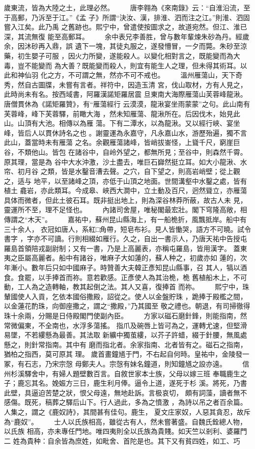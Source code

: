 \documentclass{ctexart}
\begin{document}
歲東流，皆為大陸之土，此理必然。 　　唐李翱為《來南錄》云：``自淮沿流，至于高郵，乃泝至于江。''《孟 子》所謂``決汝、漢，排淮、泗而注之江。''則淮、泗固嘗入江矣。此乃禹 之舊跡也。熙宁中，曾遣使按圖求之，故道宛然。但江、淮已深，其流無復 能至高郵耳。 　　余中表兄李善胜，曾与數年輩煉朱砂為丹。經歲余，因沐砂再入鼎，誤 遺下一塊，其徒丸服之，遂發懵冒，一夕而斃。朱砂至涼藥，初生嬰子可服 ，因火力所變，遂能殺人。以變化相對言之，既能變而為大毒，豈不能變而 為大善？既能變而殺人，則宜有能生人之理，但未得其術耳。以此和神仙羽 化之方，不可謂之無，然亦不可不戒也。 　　溫州雁蕩山，天下奇秀，然自古圖牒，未嘗有言者。祥符中，因造玉清 宮，伐山取材，方有人見之，此時尚未有名。按西域書，阿羅漢諾矩羅居震 旦東南大海際雁蕩山芙蓉峰龍湫。唐僧貫休為《諾矩羅贊》，有``雁蕩經行 云漠漠，龍湫宴坐雨蒙蒙''之句。此山南有芙蓉峰，峰下芙蓉驛，前瞰大海 ，然未知雁蕩、龍湫所在。后因伐木，始見此山。山頂有大池。相傳以為雁 蕩。下有二潭水，以為龍湫。又以經行峽、宴坐峰，皆后人以貫休詩名之也 。謝靈運為永嘉守，凡永嘉山水，游歷殆遍，獨不言此山，蓋當時未有雁蕩 之名。余觀雁蕩諸峰，皆峭拔崟怪，上聳千尺，窮崖巨谷，不類他山。皆包 在諸谷中，自岭外望之，都無所見；至谷中，則森然千霄。原其理，當是為 谷中大水沖激，沙土盡去，唯巨石巋然挺立耳。如大小龍湫、水帘、初月谷 之類，皆是水鑿音漕去聲。之穴，自下望之，則高岩峭壁；從上觀之，适与 地平，以至諸峰之頂，亦低于山頂之地面。世間溝壑中水鑿之處，皆有植土 龕岩，亦此類耳。今成皋、峽西大澗中，立土動及百尺，迥然聳立，亦雁蕩 具体而微者，但此土彼石耳。既非挺出地上，則為深谷林莽所蔽，故古人未 見，靈運所不至，理不足怪也。 　　內諸司舍屋，唯秘閣最宏壯。閣下穹隆高敞，相傳謂之``木天''。 　　嘉祐中，蘇州昆山縣海上，有一船桅折，風飄抵岸。船中有三十余人， 衣冠如唐人，系紅□角帶，短皂布衫。見人皆慟哭，語方不可曉。試令書字 ，字亦不可讀。行則相綴如雁行。久之，自出一書示人，乃唐天祐中告授屯 羅島首領陪戎副尉制；又有一書，乃是上高麗表，亦稱屯羅島，皆用漢字。 蓋東夷之臣屬高麗者。船中有諸谷，唯麻子大如蓮的，蘇人种之，初歲亦如 蓮的，次年漸小。數年后只如中國麻子。時贊善大夫韓正彥知昆山縣事，召 其人，犒以酒食。食罷，以手捧首而祢。意若歡感。正彥使人為其治桅，桅 舊植船木上，不可動，工人為之造轉軸，教其起倒之法。其人又喜，復捧首 而祢。 　　熙宁中，珠輦國使人入貢，乞依本國俗撒殿，詔從之。使人以金盤貯珠 ，跪捧于殿檻之間，以金蓮花酌珠，向御座撒之，謂之``撒殿，''乃其國至 敬之禮也。朝退，有司掃徹得珠十余兩，分賜是日侍殿閣門使副內臣。 　　方家以磁石磨針鋒，則能指南，然常微偏東，不全南也，水浮多蕩搖。 指爪及碗唇上皆可為之，運轉尤速，但堅滑易墜，不若縷懸為最善。其法取 新纊中獨茧縷，以芥子許蜡，綴于針腰，無風處懸之，則針常指南。其中有 磨而指北者。余家指南、北者皆有之。磁石之指南，猶柏之指西，莫可原其 理。 歲首畫鐘馗于門，不右起自何時。皇祐中，金陵發一冢，有石志，乃宋宗愨 母鄭夫人。宗愨有妹名鐘道，則知鐘馗之設亦遠。 　　信州杉溪驛舍中，有婦人題壁數百言。自敘世家本士族，父母以嫁三班 奉職鹿生之子；鹿忘其名。娩娠方三日，鹿生利月俸。逼令上道，遂死于杉 溪。將死，乃書此壁，具逼迫苦楚之狀，恨父母遠，無地赴訴。言极哀切， 頗有詞藻，讀者無不感傷。既死，稿葬之驛后山下。行人過此，多為之憤激 ，為詩以吊之者百余篇。人集之，謂之《鹿奴詩》，其間甚有佳句。鹿生， 夏文庄家奴，人惡其貪忍，故斥為``鹿奴''。 　　士人以氏族相高，雖從古有人，然未嘗著盛。自魏氏銓總人物，以氏族 相高，亦未專任門地。唯四夷則全以氏族為貴賤。如天竺以剎利、婆羅門二 姓為貴种：自余皆為庶姓，如毗舍、首陀是也。其下又有貧四姓，如工、巧 
\end{document}
